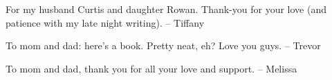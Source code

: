 
\thispagestyle{empty}

\begin{center}
For my husband Curtis and daughter Rowan. Thank-you for your love 
\linebreak(and patience with my late night writing).
\linebreak-- Tiffany

To mom and dad: here's a book. Pretty neat, eh? Love you guys.
\linebreak-- Trevor

To mom and dad, thank you for all your love and support.
\linebreak-- Melissa
\end{center}

\cleardoublepage\newpage\thispagestyle{empty}\null

\setlength{\abovedisplayskip}{-5pt}
\setlength{\abovedisplayshortskip}{-5pt}
